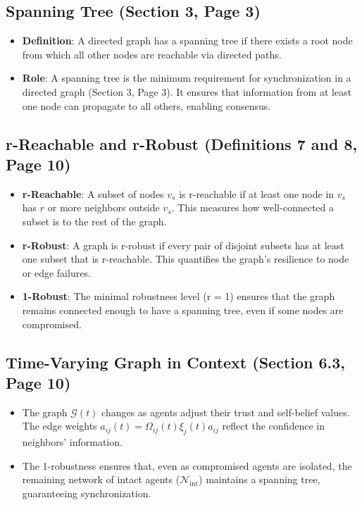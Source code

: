 \documentclass{article}
\begin{document}
\subsection{Spanning Tree (Section 3, Page 3)}
\begin{itemize}
    \item \textbf{Definition}: A directed graph has a spanning tree if there exists a root node from which all other nodes are reachable via directed paths.
    
    \item \textbf{Role}: A spanning tree is the minimum requirement for synchronization in a directed graph (Section 3, Page 3). It ensures that information from at least one node can propagate to all others, enabling consensus.
\end{itemize}

\subsection{r-Reachable and r-Robust (Definitions 7 and 8, Page 10)}
\begin{itemize}
    \item \textbf{r-Reachable}: A subset of nodes $v_s$ is r-reachable if at least one node in $v_s$ has $r$ or more neighbors outside $v_s$. This measures how well-connected a subset is to the rest of the graph.
    
    \item \textbf{r-Robust}: A graph is r-robust if every pair of disjoint subsets has at least one subset that is r-reachable. This quantifies the graph's resilience to node or edge failures.
    
    \item \textbf{1-Robust}: The minimal robustness level (r = 1) ensures that the graph remains connected enough to have a spanning tree, even if some nodes are compromised.
\end{itemize}

\subsection{Time-Varying Graph in Context (Section 6.3, Page 10)}
\begin{itemize}
    \item The graph $\mathcal{G}(t)$ changes as agents adjust their trust and self-belief values. The edge weights $a_{ij}(t) = \Omega_{ij}(t) \xi_j(t) a_{ij}$ reflect the confidence in neighbors' information.
    
    \item The 1-robustness ensures that, even as compromised agents are isolated, the remaining network of intact agents ($\mathcal{N}_{\text{int}}$) maintains a spanning tree, guaranteeing synchronization.
\end{itemize}
\end{document}
